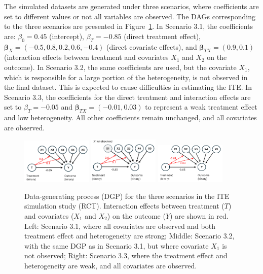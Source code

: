 The simulated datasets are generated under three scenarios, where coefficients are set to different values or not all variables are observed. The DAGs corresponding to the three scenarios are presented in Figure~\ref{fig:simulation_dags}. In Scenario 3.1, the coefficients are: $\beta_0 = 0.45$ (intercept), $\beta_T = -0.85$ (direct treatment effect), $\boldsymbol{\beta}_X = (-0.5, 0.8, 0.2, 0.6, -0.4)$ (direct covariate effects), and $\boldsymbol{\beta}_{TX} = (0.9, 0.1)$ (interaction effects between treatment and covariates $X_1$ and $X_2$ on the outcome). In Scenario 3.2, the same coefficients are used, but the covariate $X_1$, which is responsible for a large portion of the heterogeneity, is not observed in the final dataset. This is expected to cause difficulties in estimating the ITE. In Scenario 3.3, the coefficients for the direct treatment and interaction effects are set to $\beta_T = -0.05$ and $\boldsymbol{\beta}_{TX} = (-0.01, 0.03)$ to represent a weak treatment effect and low heterogeneity. All other coefficients remain unchanged, and all covariates are observed. 



\begin{figure}[H]
\centering
\includegraphics[width=0.3\textwidth]{img/results_ITE_simulation/simulation_observed.png}
\includegraphics[width=0.3\textwidth]{img/results_ITE_simulation/simulation_unobserved.png}
\includegraphics[width=0.3\textwidth]{img/results_ITE_simulation/simulation_small_effects.png}
\caption{Data-generating process (DGP) for the three scenarios in the ITE simulation study (RCT). Interaction effects between treatment ($T$) and covariates ($X_1$ and $X_2$) on the outcome ($Y$) are shown in red. Left: Scenario 3.1, where all covariates are observed and both treatment effect and heterogeneity are strong; Middle: Scenario 3.2, with the same DGP as in Scenario 3.1, but where covariate $X_1$ is not observed; Right: Scenario 3.3, where the treatment effect and heterogeneity are weak, and all covariates are observed.}
\label{fig:simulation_dags}
\end{figure}




